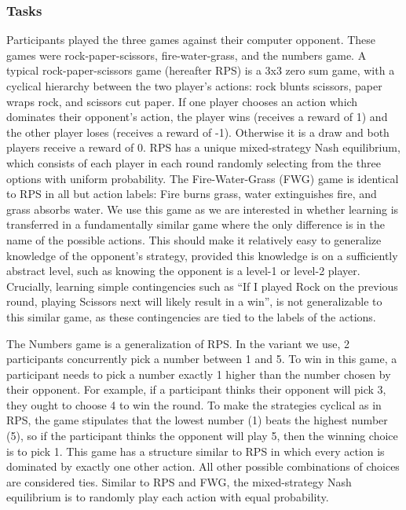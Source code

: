 \documentclass[man,floatsintext]{apa6}
\begin{document}
\hypertarget{tasks}{%
\subsubsection{Tasks}\label{tasks}}

Participants played the three games against their computer opponent. These games were rock-paper-scissors, fire-water-grass, and the numbers game. A typical rock-paper-scissors game (hereafter RPS) is a 3x3 zero sum game, with a cyclical hierarchy between the two player's actions: rock blunts scissors, paper wraps rock, and scissors cut paper. If one player chooses an action which dominates their opponent's action, the player wins (receives a reward of 1) and the other player loses (receives a reward of -1). Otherwise it is a draw and both players receive a reward of 0. RPS has a unique mixed-strategy Nash equilibrium, which consists of each player in each round randomly selecting from the three options with uniform probability. The Fire-Water-Grass (FWG) game is identical to RPS in all but action labels: Fire burns grass, water extinguishes fire, and grass absorbs water. We use this game as we are interested in whether learning is transferred in a fundamentally similar game where the only difference is in the name of the possible actions. This should make it relatively easy to generalize knowledge of the opponent's strategy, provided this knowledge is on a sufficiently abstract level, such as knowing the opponent is a level-1 or level-2 player. Crucially, learning simple contingencies such as ``If I played Rock on the previous round, playing Scissors next will likely result in a win'', is not generalizable to this similar game, as these contingencies are tied to the labels of the actions.

The Numbers game is a generalization of RPS. In the variant we use, 2 participants concurrently pick a number between 1 and 5. To win in this game, a participant needs to pick a number exactly 1 higher than the number chosen by their opponent. For example, if a participant thinks their opponent will pick 3, they ought to choose 4 to win the round. To make the strategies cyclical as in RPS, the game stipulates that the lowest number (1) beats the highest number (5), so if the participant thinks the opponent will play 5, then the winning choice is to pick 1. This game has a structure similar to RPS in which every action is dominated by exactly one other action. All other possible combinations of choices are considered ties. Similar to RPS and FWG, the mixed-strategy Nash equilibrium is to randomly play each action with equal probability.
\end{document}
